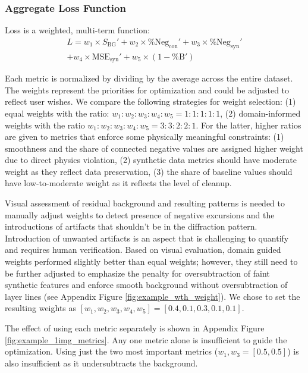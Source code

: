 \documentclass[iucr,review]{iucrjournals}
\begin{document}
\subsubsection{Aggregate Loss Function}
Loss is a weighted, multi-term function:
$$\begin{aligned}
L = w_1 \times S_{\mathrm{BG}}' + w_2 \times \%\mathrm{Neg}_{\mathrm{con}}' + w_3 \times   \%\mathrm{Neg}_{\mathrm{syn}}'\\
+ w_4 \times \mathrm{MSE}_{\mathrm{syn}}' + w_5 \times (1-\%\mathrm{B}')
\end{aligned}$$

Each metric is normalized by dividing by the average across the entire dataset.
The weights represent the priorities for optimization and could be adjusted to reflect user wishes. 
We compare the following strategies for weight selection: (1) equal weights with the ratio: $w_1 : w_2 : w_3 : w_4 : w_5 = 1 : 1 : 1 : 1 : 1 $,
(2) domain-informed weights with the ratio $w_1 : w_2 : w_3 : w_4 : w_5 = 3 : 3 : 2 : 2 : 1 $.
For the latter, higher ratios are given to metrics that enforce some physically meaningful constraints: (1)
smoothness and the share of connected negative values
are assigned higher weight due to direct physics violation, (2)
synthetic data metrics
should have moderate weight as they reflect data preservation, (3) the share of baseline values
should have low-to-moderate weight as it reflects the level of cleanup.

Visual assessment of residual background and resulting patterns is needed to manually adjust weights to detect
presence of negative excursions and the introductions of artifacts that shouldn't be in the diffraction pattern.
Introduction of unwanted artifacts is an aspect that is challenging to quantify and requires human verification. 
Based on visual evaluation, domain guided weights performed slightly better than equal weights; however,
they still need to be further adjusted to emphasize
the penalty for oversubtraction of faint synthetic features and enforce smooth background without oversubtraction
of layer lines (see Appendix Figure \ref{fig:example_wth_weight}). We chose to set the resulting weights as 
$[w_1, w_2, w_3, w_4, w_5] = [0.4, 0.1, 0.3, 0.1, 0.1]$. 

The effect of using each metric separately is shown in Appendix Figure \ref{fig:example_1img_metrics}. 
Any one metric alone is insufficient to guide the optimization. Using just the two most important metrics ($w_1, w_3 = [0.5, 0.5]$)
is also insufficient as it undersubtracts the background. 
\end{document}
